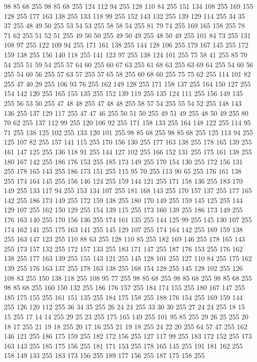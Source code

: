 98 85 68 255 98 85 68 255 124 112 94 255 128 110 84 255 151 134 108 255 169 155 128 255 177 163 138 255 133 118 99 255 152 143 132 255 139 129 114 255 34 35 37 255 48 49 50 255 53 54 53 255 58 58 54 255 81 79 74 255 169 165 158 255 78 71 62 255 51 52 51 255 49 50 50 255 49 50 49 255 48 50 49 255 101 84 73 255 131 108 97 255 122 109 94 255 171 161 138 255 144 128 106 255 179 167 145 255 172 159 138 255 156 140 118 255 141 123 97 255 138 124 101 255 75 58 41 255 85 70 54 255 51 59 54 255 57 64 60 255 60 67 63 255 61 68 63 255 63 69 64 255 54 60 56 255 54 60 56 255 57 63 57 255 57 65 58 255 60 68 60 255 75 75 62 255 114 101 82 255 47 40 29 255 106 93 76 255 162 149 128 255 171 158 137 255 164 150 127 255 154 142 120 255 165 155 135 255 152 139 119 255 135 124 111 255 156 149 135 255 56 53 50 255 47 48 48 255 47 48 48 255 58 57 54 255 55 54 52 255 148 143 136 255 137 129 117 255 47 47 46 255 50 51 50 255
49 51 49 255 48 50 49 255 80 70 62 255 137 112 99 255 120 106 92 255 171 158 133 255 164 148 122 255 114 95 71 255 138 125 102 255 133 120 101 255 98 85 68 255 98 85 68 255 125 113 94 255 125 107 82 255 157 141 115 255 170 156 130 255 177 163 138 255 178 165 139 255 161 147 125 255 136 118 91 255 144 127 102 255 166 152 131 255 175 161 138 255 180 167 142 255 186 176 153 255 185 173 149 255 170 154 130 255 172 156 131 255 178 165 143 255 186 173 151 255 115 95 70 255 113 90 65 255 176 161 138 255 174 164 145 255 156 146 124 255 159 144 121 255 171 158 136 255 183 170 149 255 133 117 94 255 153 134 107 255 181 168 143 255 170 157 137 255 177 165 142 255 186 173 149 255 172 159 138 255 180 170 149 255 159 145 125 255 144 129 107 255 162 150 129 255 154 139 115 255 173 160 139 255 186 173 149 255 176 163 140 255 170 156 136 255 174 161 135 255 144 125 99 255 145 130 107 255 174 162 141 255 175 163 141 255 145 129 107 255 174 164 142 255 169 159 138 255 163 147 123 255 110 88 63 255
128 110 85 255 182 169 146 255 178 165 143 255 173 157 132 255 172 157 133 255 183 171 147 255 187 176 153 255 176 162 138 255 177 163 139 255 155 143 121 255 145 128 101 255 127 110 84 255 175 162 139 255 176 163 137 255 178 163 138 255 168 154 128 255 145 128 102 255 126 108 83 255 150 138 118 255 108 95 77 255 98 85 68 255 98 85 68 255 98 85 68 255 98 85 68 255 160 150 132 255 186 176 157 255 184 174 155 255 180 167 147 255 185 175 155 255 161 151 135 255 184 175 158 255 188 176 154 255 169 159 144 255 126 120 112 255 36 34 35 255 26 24 24 255 33 30 30 255 27 24 24 255 18 15 15 255 17 14 14 255 29 25 23 255 175 165 149 255 101 95 85 255 29 26 25 255 20 18 17 255 21 19 18 255 20 17 16 255 21 19 18 255 24 22 20 255 64 57 47 255 162 146 121 255 186 175 159 255 182 172 156 255 127 117 99 255 183 172 152 255 173 163 143 255 185 175 156 255 181 171 153 255 178 165 145 255 191 181 162 255 158 149 133 255 183 173 156 255 189 177 156 255 187 175 158 255
